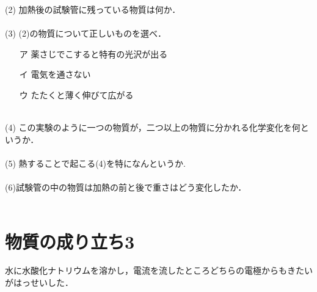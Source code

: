\documentclass[autodetect-engine,dvi=dvipdfmx,ja=standard,
               a4j,11pt]{bxjsarticle}
\begin{document}
    (2) 加熱後の試験管に残っている物質は何か．\\\\

    (3) (2)の物質について正しいものを選べ．
    \begin{itemize}
        \item [ア]  薬さじでこすると特有の光沢が出る\\
        \item [イ]  電気を通さない\\
        \item [ウ]  たたくと薄く伸びて広がる\\\\
    \end{itemize}
    

    (4) この実験のように一つの物質が，二つ以上の物質に分かれる化学変化を何というか．\\\\

    (5) 熱することで起こる(4)を特になんというか.\\\\

    (6)試験管の中の物質は加熱の前と後で重さはどう変化したか．\\\\
    \clearpage
\section{物質の成り立ち3}
\begin{figure}[htb]
        \centering
        \vspace{20pt} %
        \caption{}
\end{figure}
水に水酸化ナトリウムを溶かし，電流を流したところどちらの電極からもきたいがはっせいした．\\\\
\end{document}
